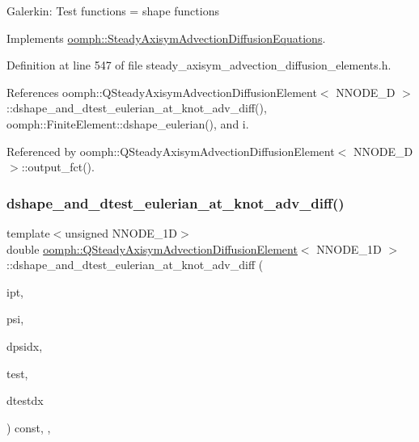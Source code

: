 Galerkin\+: Test functions = shape functions 

Implements \hyperlink{classoomph_1_1SteadyAxisymAdvectionDiffusionEquations_a0c28aea2e5996566b1a9bf2db033aa49}{oomph\+::\+Steady\+Axisym\+Advection\+Diffusion\+Equations}.



Definition at line 547 of file steady\+\_\+axisym\+\_\+advection\+\_\+diffusion\+\_\+elements.\+h.



References oomph\+::\+Q\+Steady\+Axisym\+Advection\+Diffusion\+Element$<$ N\+N\+O\+D\+E\+\_\+D $>$\+::dshape\+\_\+and\+\_\+dtest\+\_\+eulerian\+\_\+at\+\_\+knot\+\_\+adv\+\_\+diff(), oomph\+::\+Finite\+Element\+::dshape\+\_\+eulerian(), and i.



Referenced by oomph\+::\+Q\+Steady\+Axisym\+Advection\+Diffusion\+Element$<$ N\+N\+O\+D\+E\+\_\+D $>$\+::output\+\_\+fct().

\mbox{\label{classoomph_1_1QSteadyAxisymAdvectionDiffusionElement_aa4c9a7d6ebe2fcc8400d3309d508e2a9}} 
\subsubsection{\texorpdfstring{dshape\+\_\+and\+\_\+dtest\+\_\+eulerian\+\_\+at\+\_\+knot\+\_\+adv\+\_\+diff()}{dshape\_and\_dtest\_eulerian\_at\_knot\_adv\_diff()}}
{\footnotesize\ttfamily template$<$unsigned N\+N\+O\+D\+E\+\_\+1D$>$ \\
double \hyperlink{classoomph_1_1QSteadyAxisymAdvectionDiffusionElement}{oomph\+::\+Q\+Steady\+Axisym\+Advection\+Diffusion\+Element}$<$ N\+N\+O\+D\+E\+\_\+1D $>$\+::dshape\+\_\+and\+\_\+dtest\+\_\+eulerian\+\_\+at\+\_\+knot\+\_\+adv\+\_\+diff (\begin{DoxyParamCaption}\item[{const unsigned \&}]{ipt,  }\item[{\hyperlink{classoomph_1_1Shape}{Shape} \&}]{psi,  }\item[{\hyperlink{classoomph_1_1DShape}{D\+Shape} \&}]{dpsidx,  }\item[{\hyperlink{classoomph_1_1Shape}{Shape} \&}]{test,  }\item[{\hyperlink{classoomph_1_1DShape}{D\+Shape} \&}]{dtestdx }\end{DoxyParamCaption}) const\hspace{0.3cm}{\ttfamily [inline]}, {\ttfamily [protected]}, {\ttfamily [virtual]}}



